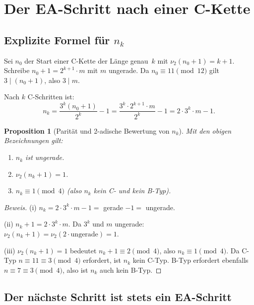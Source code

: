 \documentclass[12pt,a4paper]{article}
\newtheorem{proposition}[definition]{Proposition}
\newenvironment{beweis}{\begin{proof}[Beweis]}{\end{proof}}
\newcommand{\vii}{\nu_2}
\begin{document}
	\section{Der EA-Schritt nach einer C-Kette}
	\label{sec:eastep}
	
	\subsection{Explizite Formel für $n_k$}
	
	Sei $n_0$ der Start einer C-Kette der Länge genau~$k$ mit $\vii(n_0+1) = k+1$.
	Schreibe $n_0 + 1 = 2^{k+1} \cdot m$ mit $m$ ungerade.
	Da $n_0 \equiv 11 \pmod{12}$ gilt $3 \mid (n_0+1)$, also $3 \mid m$.
	
	Nach $k$ C-Schritten ist:
	\[
	n_k = \frac{3^k(n_0+1)}{2^k} - 1
	= \frac{3^k \cdot 2^{k+1} \cdot m}{2^k} - 1
	= 2 \cdot 3^k \cdot m - 1.
	\]
	
	\begin{proposition}[Parität und 2-adische Bewertung von $n_k$]
		\label{prop:nk}
		Mit den obigen Bezeichnungen gilt:
		\begin{enumerate}[label=(\roman*)]
			\item $n_k$ ist ungerade.
			\item $\vii(n_k + 1) = 1$.
			\item $n_k \equiv 1 \pmod 4$ (also $n_k$ kein C- und kein B-Typ).
		\end{enumerate}
	\end{proposition}
	
	\begin{beweis}
		(i) $n_k = 2 \cdot 3^k \cdot m - 1 =$ gerade $-1 =$ ungerade. \checkmark
		
		(ii) $n_k + 1 = 2 \cdot 3^k \cdot m$. Da $3^k$ und $m$ ungerade:
		$\vii(n_k+1) = \vii(2 \cdot \text{ungerade}) = 1$. \checkmark
		
		(iii) $\vii(n_k+1) = 1$ bedeutet $n_k + 1 \equiv 2 \pmod 4$, also
		$n_k \equiv 1 \pmod 4$. Da C-Typ $n \equiv 11 \equiv 3 \pmod 4$ erfordert,
		ist $n_k$ kein C-Typ. B-Typ erfordert ebenfalls $n \equiv 7 \equiv 3 \pmod 4$,
		also ist $n_k$ auch kein B-Typ. \qedhere
	\end{beweis}
	
	\subsection{Der nächste Schritt ist stets ein EA-Schritt}
	
\end{document}
